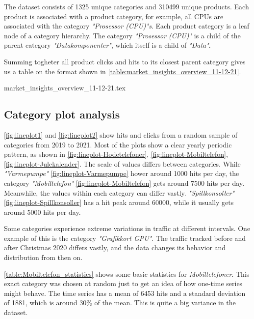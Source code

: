 The dataset consists of 1325 unique categories and 310499 unique products.
Each product is associated with a product category, for example,
all CPUs are associated with the category
\textit{"Prosessor (CPU)"s}.
Each product category is a leaf node of a category hierarchy.
The category \textit{"Prosessor (CPU)"} is a child of the parent category 
\textit{"Datakomponenter"}, which itself is a child of \textit{"Data"}.

Summing togheter all product clicks and hits to its closest parent category
gives us a table on the format shown in \autoref{table:market_insights_overview_11-12-21}.

{market_insights_overview_11-12-21.tex}

\subsection{Category plot analysis}
\autoref{fig:lineplot1} and \autoref{fig:lineplot2} show hits and clicks
from a random sample of categories from 2019 to 2021.
Most of the plots show a clear yearly periodic pattern, as shown in 
\autoref{fig:lineplot-Hodetelefoner},
\autoref{fig:lineplot-Mobiltelefon},
\autoref{fig:lineplot-Julekalender}.
The scale of values differs between categories.
While \textit{"Varmepumpe"} \autoref{fig:lineplot-Varmepumpe} hower around 1000 hits per day,
the category \textit{"Mobiltelefon"} \autoref{fig:lineplot-Mobiltelefon} gets around 7500 hits per day.
Meanwhile, the values within each category can differ vastly.
\textit{"Spillkonsoller"} \autoref{fig:lineplot-Spillkonsoller} has a hit peak around 60000,
while it usually gets around 5000 hits per day.

Some categories experience extreme variations in traffic at different intervals.
One example of this is the category \textit{"Grafikkort GPU"}.
The traffic tracked before and after Christmas 2020 differs vastly,
and the data changes its behavior and distribution from then on.

\autoref{table:Mobiltelefon_statistics} shows some basic statistics for \textit{Mobiltelefoner}.
This exact category was chosen at random just to get an idea of how one-time series might behave.
The time series has a mean of 6453 hits and a standard deviation of 1881, which is
around 30\% of the mean. This is quite a big variance in the dataset.

